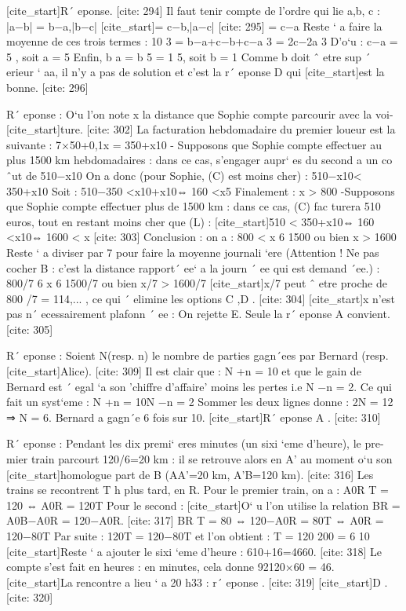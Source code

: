 [cite_start]R´ eponse. [cite: 294]
Il faut tenir compte de l’ordre qui lie a,b, c :
 |a−b| = b−a,|b−c| [cite_start]= c−b,|a−c| [cite: 295]
= c−a
 Reste ` a faire la moyenne de ces trois termes : 
 10
 3
 =
 b−a+c−b+c−a
 3
 =
 2c−2a
 3
 D’o`u : 
 c−a = 5 , soit a = 5
 Enfin,
 b
 a
 =
 b
 5
 =
 1
 5, soit b = 1
 Comme b doit ˆ etre sup ´ erieur ` aa, il n’y a pas de solution et c’est la r´ eponse D qui
 [cite_start]est la bonne. [cite: 296]

R´ eponse :
 O`u l’on note x la distance que Sophie compte parcourir avec la voi- 
 [cite_start]ture. [cite: 302]
La facturation hebdomadaire du premier loueur est la suivante :
 7×50+0,1x = 350+x10
 - Supposons que Sophie compte effectuer au plus 1500 km hebdomadaires : dans
 ce cas, s’engager aupr` es du second a un co ˆut de 
 510−x10
 On a donc (pour Sophie, (C) est moins cher) :
 510−x10< 350+x10
 Soit :
 510−350 <x10+x10⇔ 160 <x5
 Finalement :
 x > 800
 -Supposons que Sophie compte effectuer plus de 1500 km : dans ce cas, (C) fac 
 turera 510 euros, tout en restant moins cher que (L) :
 [cite_start]510 < 350+x10⇔ 160 <x10⇔ 1600 < x [cite: 303]
Conclusion : on a :
 800 < x 6 1500 ou bien x > 1600
 Reste ` a diviser par 7 pour faire la moyenne journali `ere (Attention ! Ne pas cocher 
 B : c’est la distance rapport´ ee` a la journ ´ ee qui est demand ´ee.) : 
 800/7 6 x 6 1500/7 ou bien x/7 > 1600/7
 [cite_start]x/7 peut ˆ etre proche de 800 /7 = 114,... , ce qui ´ elimine les options C ,D . [cite: 304]
[cite_start]x n’est pas n´ ecessairement plafonn ´ ee : On rejette E. Seule la r´ eponse A convient. [cite: 305]

R´ eponse : Soient N(resp. n) le nombre de parties gagn´ees par Bernard (resp. 
 [cite_start]Alice). [cite: 309]
Il est clair que : N +n = 10 et que le gain de Bernard est ´ egal `a son ’chiffre 
 d’affaire’ moins les pertes i.e N −n = 2. Ce qui fait un syst`eme : 
  N +n = 10N −n = 2
 Sommer les deux lignes donne : 2N = 12 ⇒ N = 6.
 Bernard a gagn´e 6 fois sur 10. 
 [cite_start]R´ eponse A . [cite: 310]

R´ eponse : Pendant les dix premi` eres minutes (un sixi `eme d’heure), le pre- 
 mier train parcourt 120/6=20 km : il se retrouve alors en A’ au moment o`u son 
 [cite_start]homologue part de B (AA’=20 km, A’B=120 km). [cite: 316]
Les trains se recontrent T h
 plus tard, en R.
 Pour le premier train, on a :
 A0R
 T
 = 120 ⇔ A0R = 120T
 Pour le second :
 [cite_start]O` u l’on utilise la relation BR = A0B−A0R = 120−A0R. [cite: 317]
BR
 T
 = 80 ⇔ 120−A0R = 80T ⇔ A0R = 120−80T
 Par suite :
 120T = 120−80T
 et l’on obtient :
 T =
 120
 200
 =
 6
 10
 [cite_start]Reste ` a ajouter le sixi `eme d’heure : 610+16=4660. [cite: 318]
Le compte s’est fait en heures : en minutes, cela donne 92120×60 = 46.
 [cite_start]La rencontre a lieu ` a 20 h33 : r´ eponse . [cite: 319]
[cite_start]D . [cite: 320]

